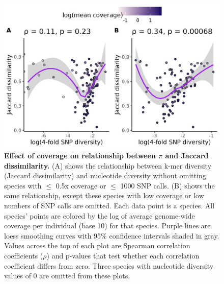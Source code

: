\documentclass[12pt]{article}
\begin{document}
\begin{figure}[H]
    \centering
    \includegraphics[width=\textwidth]{figures/appendix_d/pi_vs_jac_high_vs_low_cov_2024-12-12.jpg}
    \caption{\textbf{Effect of coverage on relationship between $\pi$ and Jaccard dissimilarity.} (A) shows the relationship between k-mer diversity (Jaccard dissimilarity) and nucleotide diversity without omitting species with $\leq$ 0.5x coverage or $\leq$ 1000 SNP calls. (B) shows the same relationship, except these species with low coverage or low numbers of SNP calls are omitted. Each data point is a species. All species' points are colored by the log of average genome-wide coverage per individual (base 10) for that species. Purple lines are loess smoothing curves with 95\% confidence intervals shaded in gray. Values across the top of each plot are Spearman correlation coefficients ($\rho$) and p-values that test whether each correlation coefficient differs from zero. Three species with nucleotide diversity values of 0 are omitted from these plots.}
\end{figure}
\end{document}
